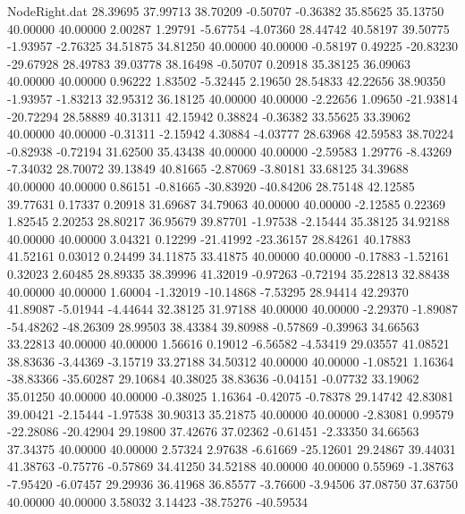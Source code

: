 \begin{filecontents}{NodeRight.dat}
  28.39695   37.99713   38.70209    -0.50707   -0.36382   35.85625   35.13750   40.00000   40.00000    2.00287    1.29791   -5.67754   -4.07360
  28.44742   40.58197   39.50775    -1.93957   -2.76325   34.51875   34.81250   40.00000   40.00000   -0.58197    0.49225  -20.83230  -29.67928
  28.49783   39.03778   38.16498    -0.50707    0.20918   35.38125   36.09063   40.00000   40.00000    0.96222    1.83502   -5.32445    2.19650
  28.54833   42.22656   38.90350    -1.93957   -1.83213   32.95312   36.18125   40.00000   40.00000   -2.22656    1.09650  -21.93814  -20.72294
  28.58889   40.31311   42.15942     0.38824   -0.36382   33.55625   33.39062   40.00000   40.00000   -0.31311   -2.15942    4.30884   -4.03777
  28.63968   42.59583   38.70224    -0.82938   -0.72194   31.62500   35.43438   40.00000   40.00000   -2.59583    1.29776   -8.43269   -7.34032
  28.70072   39.13849   40.81665    -2.87069   -3.80181   33.68125   34.39688   40.00000   40.00000    0.86151   -0.81665  -30.83920  -40.84206
  28.75148   42.12585   39.77631     0.17337    0.20918   31.69687   34.79063   40.00000   40.00000   -2.12585    0.22369    1.82545    2.20253
  28.80217   36.95679   39.87701    -1.97538   -2.15444   35.38125   34.92188   40.00000   40.00000    3.04321    0.12299  -21.41992  -23.36157
  28.84261   40.17883   41.52161     0.03012    0.24499   34.11875   33.41875   40.00000   40.00000   -0.17883   -1.52161    0.32023    2.60485
  28.89335   38.39996   41.32019    -0.97263   -0.72194   35.22813   32.88438   40.00000   40.00000    1.60004   -1.32019  -10.14868   -7.53295
  28.94414   42.29370   41.89087    -5.01944   -4.44644   32.38125   31.97188   40.00000   40.00000   -2.29370   -1.89087  -54.48262  -48.26309
  28.99503   38.43384   39.80988    -0.57869   -0.39963   34.66563   33.22813   40.00000   40.00000    1.56616    0.19012   -6.56582   -4.53419
  29.03557   41.08521   38.83636    -3.44369   -3.15719   33.27188   34.50312   40.00000   40.00000   -1.08521    1.16364  -38.83366  -35.60287
  29.10684   40.38025   38.83636    -0.04151   -0.07732   33.19062   35.01250   40.00000   40.00000   -0.38025    1.16364   -0.42075   -0.78378
  29.14742   42.83081   39.00421    -2.15444   -1.97538   30.90313   35.21875   40.00000   40.00000   -2.83081    0.99579  -22.28086  -20.42904
  29.19800   37.42676   37.02362    -0.61451   -2.33350   34.66563   37.34375   40.00000   40.00000    2.57324    2.97638   -6.61669  -25.12601
  29.24867   39.44031   41.38763    -0.75776   -0.57869   34.41250   34.52188   40.00000   40.00000    0.55969   -1.38763   -7.95420   -6.07457
  29.29936   36.41968   36.85577    -3.76600   -3.94506   37.08750   37.63750   40.00000   40.00000    3.58032    3.14423  -38.75276  -40.59534

\end{filecontents}
